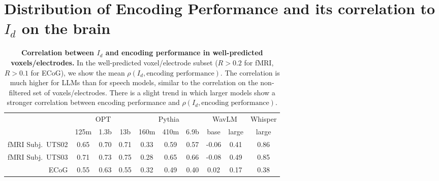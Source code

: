\documentclass{article}
\theoremstyle{plain}
\theoremstyle{definition}
\theoremstyle{remark}
\begin{document}
\FloatBarrier
\section{Distribution of Encoding Performance and its correlation to $I_d$ on the brain}
\label{app:flatmaps}

\begin{table}[h]
    \caption{\textbf{Correlation between $I_d$ and encoding performance in well-predicted voxels/electrodes.} In the well-predicted voxel/electrode subset ($R>0.2$ for fMRI, $R>0.1$ for ECoG), we show the mean $\rho(I_d, \text{encoding performance})$. The correlation is much higher for LLMs than for speech models, similar to the correlation on the non-filtered set of voxels/electrodes. There is a slight trend in which larger models show a stronger correlation between encoding performance and $\rho(I_d, \text{encoding performance})$.}
    \label{tab:app_well_predicted_subset}
    \centering
    \begin{tabular}{r|ccc|ccc|cc|c}
    & \multicolumn{3}{c|}{OPT} 
    & \multicolumn{3}{c|}{Pythia} 
    & \multicolumn{2}{c|}{WavLM} 
    & \multicolumn{1}{c}{Whisper} \\
    & 125m & 1.3b & 13b 
    & 160m & 410m & 6.9b 
    & base & large 
    & large \\
    \hline
        fMRI Subj.~UTS02   
        & 0.65 & 0.70 & 0.71 %
        & 0.33 & 0.59 & 0.57 %
        & -0.06 & 0.41 & 0.86 \\ %
        fMRI Subj.~UTS03  
        & 0.71 & 0.73 & 0.75 %
        & 0.28 & 0.65 & 0.66 %
        & -0.08 & 0.49 & 0.85 \\  %
        ECoG   
        & 0.55 & 0.63 & 0.55
        & 0.32 & 0.49 & 0.40
        & 0.02 & 0.17 & 0.38\\
        \hline 
\end{tabular}
\end{table}
\end{document}
